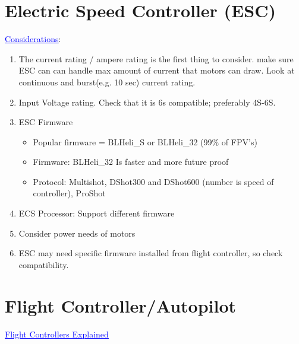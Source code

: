 \section{Electric Speed Controller (ESC)}
	\href{https://robocraze.com/blogs/post/how-to-choose-esc-for-quadcopter}{\textcolor{blue}{\underline{Considerations}}}:
	\begin{enumerate}
		\item The current rating / ampere rating is the first thing to consider. make sure ESC can can handle max amount of current that motors can draw. Look at continuous and burst(e.g. 10 sec) current rating.
		\item Input Voltage rating. Check that it is 6s compatible; preferably 4S-6S.
		\item ESC Firmware
		\begin{itemize}
			\item Popular firmware = BLHeli\_S or BLHeli\_32 (99\% of FPV's)
			\item Firmware: BLHeli\_32 Is faster and more future proof
			\item Protocol: Multishot, DShot300 and DShot600 (number is speed of controller), ProShot
		\end{itemize}
		\item ECS Processor: Support different firmware
		\item Consider power needs of motors
		\item ESC may need specific firmware installed from flight controller, so check compatibility.
	\end{enumerate}
	

\section{Flight Controller/Autopilot}
\href{https://oscarliang.com/flight-controller-explained/}{\textcolor{blue}{\underline{Flight Controllers Explained}}}
	
